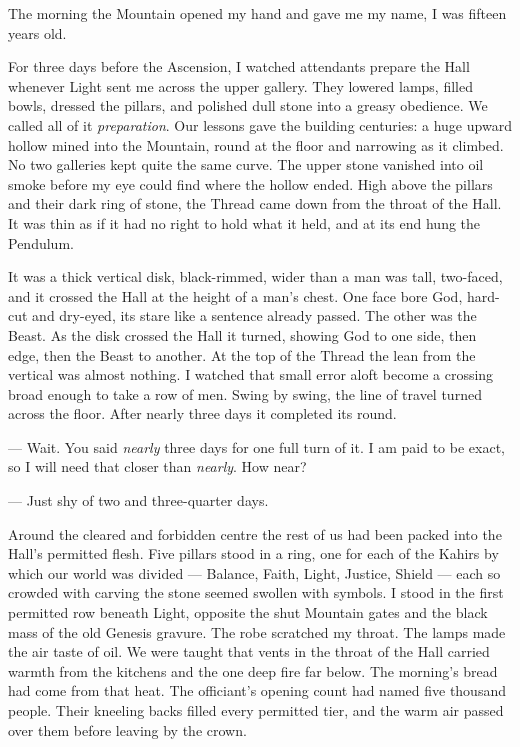 The morning the Mountain opened my hand and gave me my name, I was fifteen years old.\par

\ornament

For three days before the Ascension, I watched attendants prepare the Hall whenever Light sent me across the upper gallery. They lowered lamps, filled bowls, dressed the pillars, and polished dull stone into a greasy obedience. We called all of it \textit{preparation}. Our lessons gave the building centuries: a huge upward hollow mined into the Mountain, round at the floor and narrowing as it climbed. No two galleries kept quite the same curve. The upper stone vanished into oil smoke before my eye could find where the hollow ended. High above the pillars and their dark ring of stone, the Thread came down from the throat of the Hall. It was thin as if it had no right to hold what it held, and at its end hung the Pendulum.\par

It was a thick vertical disk, black-rimmed, wider than a man was tall, two-faced, and it crossed the Hall at the height of a man's chest. One face bore God, hard-cut and dry-eyed, its stare like a sentence already passed. The other was the Beast. As the disk crossed the Hall it turned, showing God to one side, then edge, then the Beast to another. At the top of the Thread the lean from the vertical was almost nothing. I watched that small error aloft become a crossing broad enough to take a row of men. Swing by swing, the line of travel turned across the floor. After nearly three days it completed its round.\par

\begin{room}

--- Wait. You said \emph{nearly} three days for one full turn of it. I am paid to be exact, so I will need that closer than \emph{nearly}. How near?

--- Just shy of two and three-quarter days.

\end{room}

Around the cleared and forbidden centre the rest of us had been packed into the Hall's permitted flesh. Five pillars stood in a ring, one for each of the Kahirs by which our world was divided --- Balance, Faith, Light, Justice, Shield --- each so crowded with carving the stone seemed swollen with symbols. I stood in the first permitted row beneath Light, opposite the shut Mountain gates and the black mass of the old Genesis gravure. The robe scratched my throat. The lamps made the air taste of oil. We were taught that vents in the throat of the Hall carried warmth from the kitchens and the one deep fire far below. The morning's bread had come from that heat. The officiant's opening count had named five thousand people. Their kneeling backs filled every permitted tier, and the warm air passed over them before leaving by the crown.\par

